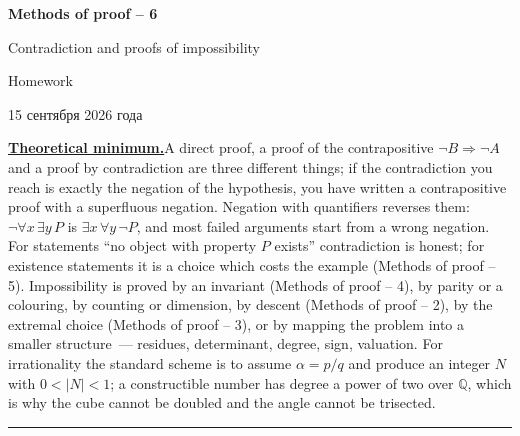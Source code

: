 \documentclass[11pt,a4paper]{article}
\begin{document}
\begin{center}
{\huge\bfseries Methods of proof -- 6\par}\vspace{1.1em}
{\Large Contradiction and proofs of impossibility\par}\vspace{1.1em}
{\Large Homework\par}\vspace{1.1em}
{\foreignlanguage{russian}{15 сентября 2026 года}\par}
\end{center}\vspace{0.4pt}

\noindent\textbf{\underline{Theoretical minimum.}}\quad A direct proof, a proof of the
contrapositive $\neg B\Rightarrow\neg A$ and a proof by contradiction are three different things;
if the contradiction you reach is exactly the negation of the hypothesis, you have written a
contrapositive proof with a superfluous negation. Negation with quantifiers reverses them:
$\neg\forall x\,\exists y\,P$ is $\exists x\,\forall y\,\neg P$, and most failed arguments start
from a wrong negation. For statements ``no object with property $P$ exists'' contradiction is
honest; for existence statements it is a choice which costs the example (Methods of proof -- 5).
Impossibility is proved by an invariant (Methods of proof -- 4), by parity or a colouring, by
counting or dimension, by descent (Methods of proof -- 2), by the extremal choice (Methods of
proof -- 3), or by mapping the problem into a smaller structure~--- residues, determinant, degree,
sign, valuation. For irrationality the standard scheme is to assume $\alpha=p/q$ and produce an
integer $N$ with $0<|N|<1$; a constructible number has degree a power of two over $\mathbb Q$,
which is why the cube cannot be doubled and the angle cannot be trisected.

\medskip
\noindent\rule{\textwidth}{0.4pt}
\end{document}

